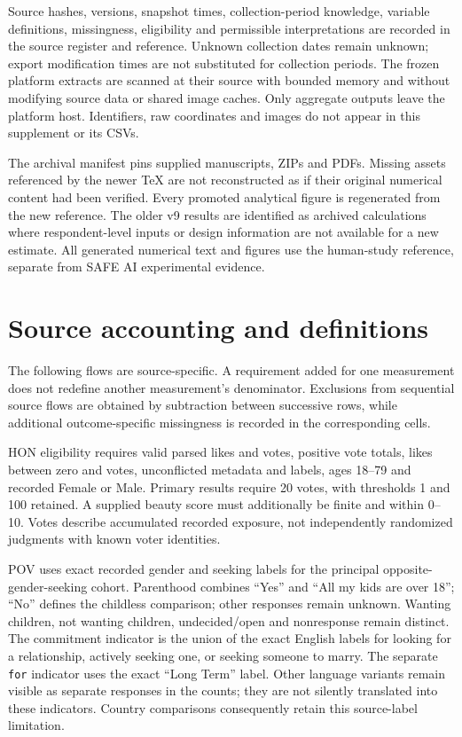 Source hashes, versions, snapshot times, collection-period knowledge, variable definitions, missingness, eligibility and permissible interpretations are recorded in the source register and reference. Unknown collection dates remain unknown; export modification times are not substituted for collection periods. The frozen platform extracts are scanned at their source with bounded memory and without modifying source data or shared image caches. Only aggregate outputs leave the platform host. Identifiers, raw coordinates and images do not appear in this supplement or its CSVs.



The archival manifest pins supplied manuscripts, ZIPs and PDFs. Missing assets referenced by the newer TeX are not reconstructed as if their original numerical content had been verified. Every promoted analytical figure is regenerated from the new reference. The older v9 results are identified as archived calculations where respondent-level inputs or design information are not available for a new estimate. All generated numerical text and figures use the human-study reference, separate from SAFE AI experimental evidence.

\section{Source accounting and definitions}

The following flows are source-specific. A requirement added for one measurement does not redefine another measurement's denominator. Exclusions from sequential source flows are obtained by subtraction between successive rows, while additional outcome-specific missingness is recorded in the corresponding cells.



HON eligibility requires valid parsed likes and votes, positive vote totals, likes between zero and votes, unconflicted metadata and labels, ages 18--79 and recorded Female or Male. Primary results require 20 votes, with thresholds 1 and 100 retained. A supplied beauty score must additionally be finite and within 0--10. Votes describe accumulated recorded exposure, not independently randomized judgments with known voter identities.

POV uses exact recorded gender and seeking labels for the principal opposite-gender-seeking cohort. Parenthood combines ``Yes'' and ``All my kids are over 18''; ``No'' defines the childless comparison; other responses remain unknown. Wanting children, not wanting children, undecided/open and nonresponse remain distinct. The commitment indicator is the union of the exact English labels for looking for a relationship, actively seeking one, or seeking someone to marry. The separate \texttt{for} indicator uses the exact ``Long Term'' label. Other language variants remain visible as separate responses in the counts; they are not silently translated into these indicators. Country comparisons consequently retain this source-label limitation.

